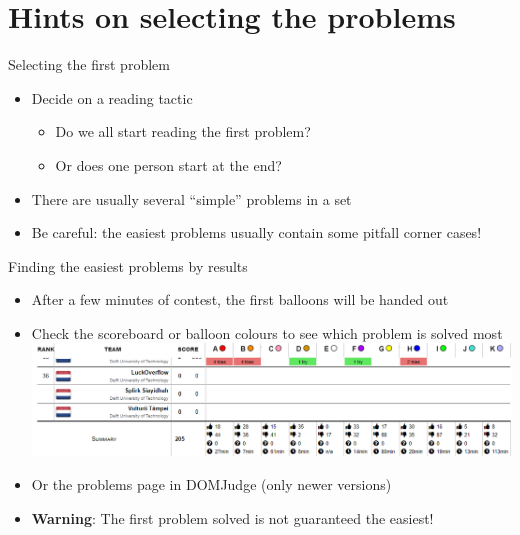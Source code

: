 \documentclass[11pt,pdf, aspectratio=169]{beamer}
\begin{document}
  \section{Hints on selecting the problems}
  \begin{frame}{Selecting the first problem}
    \begin{itemize}
      \item Decide on a reading tactic
      \begin{itemize}
        \item Do we all start reading the first problem?
        \item Or does one person start at the end?
      \end{itemize}
      \item There are usually several ``simple'' problems in a set
      \item Be careful: the easiest problems usually contain some pitfall corner cases!
    \end{itemize}
  \end{frame}
  \begin{frame}{Finding the easiest problems by results}
    \begin{itemize}
      \item After a few minutes of contest, the first balloons will be handed out
      \item Check the scoreboard or balloon colours to see which problem is solved most\\
      \includegraphics[width=\linewidth]{images/session-2/bottom-scoreboard}
      \item Or the problems page in DOMJudge (only newer versions)
      \item \textbf{Warning}: The first problem solved is not guaranteed the easiest!
    \end{itemize}
  \end{frame}
\end{document}
